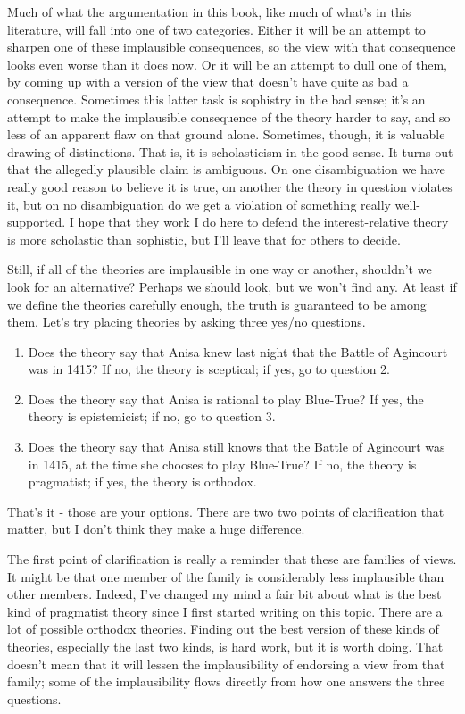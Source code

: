 \documentclass[
  10pt,
  letterpaper,
  twoside]{scrbook}
\providecommand{\tightlist}{%
  \setlength{\itemsep}{0pt}\setlength{\parskip}{0pt}}\usepackage{longtable,booktabs,array}
\begin{document}
Much of what the argumentation in this book, like much of what's in this
literature, will fall into one of two categories. Either it will be an
attempt to sharpen one of these implausible consequences, so the view
with that consequence looks even worse than it does now. Or it will be
an attempt to dull one of them, by coming up with a version of the view
that doesn't have quite as bad a consequence. Sometimes this latter task
is sophistry in the bad sense; it's an attempt to make the implausible
consequence of the theory harder to say, and so less of an apparent flaw
on that ground alone. Sometimes, though, it is valuable drawing of
distinctions. That is, it is scholasticism in the good sense. It turns
out that the allegedly plausible claim is ambiguous. On one
disambiguation we have really good reason to believe it is true, on
another the theory in question violates it, but on no disambiguation do
we get a violation of something really well-supported. I hope that they
work I do here to defend the interest-relative theory is more scholastic
than sophistic, but I'll leave that for others to decide.

Still, if all of the theories are implausible in one way or another,
shouldn't we look for an alternative? Perhaps we should look, but we
won't find any. At least if we define the theories carefully enough, the
truth is guaranteed to be among them. Let's try placing theories by
asking three yes/no questions.

\begin{enumerate}
\def\labelenumi{\arabic{enumi}.}
\tightlist
\item
  Does the theory say that Anisa knew last night that the Battle of
  Agincourt was in 1415? If no, the theory is sceptical; if yes, go to
  question 2.
\item
  Does the theory say that Anisa is rational to play Blue-True? If yes,
  the theory is epistemicist; if no, go to question 3.
\item
  Does the theory say that Anisa still knows that the Battle of
  Agincourt was in 1415, at the time she chooses to play Blue-True? If
  no, the theory is pragmatist; if yes, the theory is orthodox.
\end{enumerate}

That's it - those are your options. There are two two points of
clarification that matter, but I don't think they make a huge
difference.

The first point of clarification is really a reminder that these are
families of views. It might be that one member of the family is
considerably less implausible than other members. Indeed, I've changed
my mind a fair bit about what is the best kind of pragmatist theory
since I first started writing on this topic. There are a lot of possible
orthodox theories. Finding out the best version of these kinds of
theories, especially the last two kinds, is hard work, but it is worth
doing. That doesn't mean that it will lessen the implausibility of
endorsing a view from that family; some of the implausibility flows
directly from how one answers the three questions.
\end{document}
